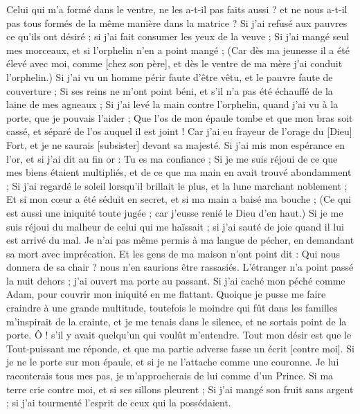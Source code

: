 \begin{multicols}{2}
Celui qui m'a formé dans le ventre, ne les a-t-il pas faits aussi ? et ne nous a-t-il pas tous formés de la même manière dans la matrice ?
Si j'ai refusé aux pauvres ce qu'ils ont désiré ; si j'ai fait consumer les yeux de la veuve ;
Si j'ai mangé seul mes morceaux, et si l'orphelin n'en a point mangé ;
(Car dès ma jeunesse il a été élevé avec moi, comme [chez son père], et dès le ventre de ma mère j'ai conduit l'orphelin.)
Si j'ai vu un homme périr faute d'être vêtu, et le pauvre faute de couverture ;
Si ses reins ne m'ont point béni, et s'il n'a pas été échauffé de la laine de mes agneaux ;
Si j'ai levé la main contre l'orphelin, quand j'ai vu à la porte, que je pouvais l'aider ;
Que l'os de mon épaule tombe et que mon bras soit cassé, et séparé de l'os auquel il est joint !
Car j'ai eu frayeur de l'orage du [Dieu] Fort, et je ne saurais [subsister] devant sa majesté.
Si j'ai mis mon espérance en l'or, et si j'ai dit au fin or : Tu es ma confiance ;
Si je me suis réjoui de ce que mes biens étaient multipliés, et de ce que ma main en avait trouvé abondamment ;
Si j'ai regardé le soleil lorsqu'il brillait le plus, et la lune marchant noblement ;
Et si mon cœur a été séduit en secret, et si ma main a baisé ma bouche ;
(Ce qui est aussi une iniquité toute jugée ; car j'eusse renié le Dieu d'en haut.)
Si je me suis réjoui du malheur de celui qui me haïssait ; si j'ai sauté de joie quand il lui est arrivé du mal.
Je n'ai pas même permis à ma langue de pécher, en demandant sa mort avec imprécation.
Et les gens de ma maison n'ont point dit : Qui nous donnera de sa chair ? nous n'en saurions être rassasiés.
L'étranger n'a point passé la nuit dehors ; j'ai ouvert ma porte au passant.
Si j'ai caché mon péché comme Adam, pour couvrir mon iniquité en me flattant.
Quoique je pusse me faire craindre à une grande multitude, toutefois le moindre qui fût dans les familles m'inspirait de la crainte, et je me tenais dans le silence, et ne sortais point de la porte.
Ô ! s'il y avait quelqu'un qui voulût m'entendre. Tout mon désir est que le Tout-puissant me réponde, et que ma partie adverse fasse un écrit [contre moi].
Si je ne le porte sur mon épaule, et si je ne l'attache comme une couronne.
Je lui raconterais tous mes pas, je m'approcherais de lui comme d'un Prince.
Si ma terre crie contre moi, et si ses sillons pleurent ;
Si j'ai mangé son fruit sans argent ; si j'ai tourmenté l'esprit de ceux qui la possédaient.

\end{multicols}
